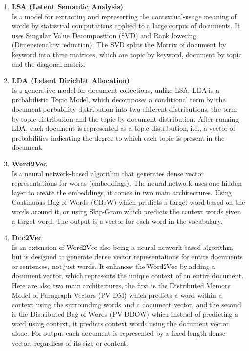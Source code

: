 \documentclass[\myFontSize,oneside,english,hidelinks,a4paper]{article}
\begin{document}
\begin{enumerate}
\item \textbf{LSA (Latent Semantic Analysis)}\\
Is a model for extracting and representing the contextual-usage meaning of words by statistical computations applied to a large corpus of documents. It uses Singular Value Decomposition (SVD) and Rank lowering (Dimensionality reduction). The SVD splits the Matrix of document by keyword into three matrices, which are topic by keyword, document by topic and the diagonal matrix.

\item \textbf{LDA (Latent Dirichlet Allocation)}\\
Is a generative model for document collections, unlike LSA, LDA is a probabilistic Topic Model, which decomposes a conditional term by the document porbability distribution into two different distributions, the term by topic distribution and the topic by document distribution. After running LDA, each document is represented as a topic distribution, i.e., a vector of probabilities indicating the degree to which each topic is present in the document. \cite{Bergamaschi2015247}

\item \textbf{Word2Vec}\\
Is a neural network-based algorithm that generates dense vector representations for words (embeddings). The neural network uses one hidden layer to create the embeddings, it comes in two main architectures. Using Continuous Bag of Words (CBoW) which predicts a target word based on the words around it, or using Skip-Gram which predicts the context words given a target word. The output is a vector for each word in the vocabulary.

\item \textbf{Doc2Vec}\\
Is an extension of Word2Vec also being a neural network-based algorithm, but is designed to generate dense vector representations for entire documents or sentences, not just words. It enhances the Word2Vec by adding a document vector, which represents the unique context of an entire document. Here are also two main architectures, the first is the Distributed Memory Model of Paragraph Vectors (PV-DM) which predicts a word within a context using the surrounding words and a document vector, and the second is the Distributed Bag of Words (PV-DBOW) which instead of predicting a word using context, it predicts context words using the document vector alone. For output each document is represented by a fixed-length dense vector, regardless of its size or content.


\end{enumerate}
\end{document}
